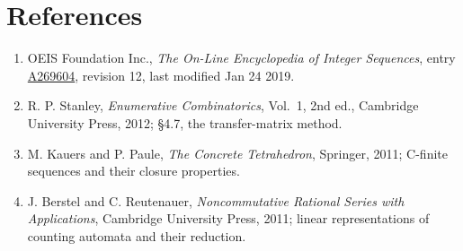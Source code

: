 \documentclass[11pt]{article}
\theoremstyle{definition}
\begin{document}
\section{References}

\begin{enumerate}

\item OEIS Foundation Inc., \emph{The On-Line Encyclopedia of Integer Sequences}, entry \href{https://oeis.org/A269604}{A269604}, revision 12, last modified Jan 24 2019.

\item R. P. Stanley, \emph{Enumerative Combinatorics}, Vol.~1, 2nd ed., Cambridge University Press, 2012; \S4.7, the transfer-matrix method.

\item M. Kauers and P. Paule, \emph{The Concrete Tetrahedron}, Springer, 2011; C-finite sequences and their closure properties.

\item J. Berstel and C. Reutenauer, \emph{Noncommutative Rational Series with Applications}, Cambridge University Press, 2011; linear representations of counting automata and their reduction.

\end{enumerate}
\end{document}
